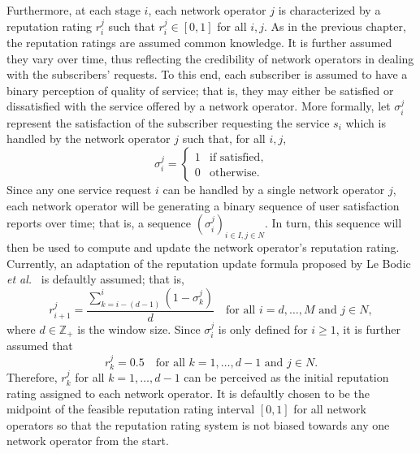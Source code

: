 Furthermore, at each stage $i$, each network operator $j$ is characterized by a reputation rating $r^j_i$ such that $r^j_i\in[0,1]$ for all $i,j$. As in the previous chapter, the reputation ratings are assumed common knowledge. It is further assumed they vary over time, thus reflecting the credibility of network operators in dealing with the subscribers' requests. To this end, each subscriber is assumed to have a binary perception of quality of service; that is, they may either be satisfied or dissatisfied with the service offered by a network operator. More formally, let $\sigma^j_i$ represent the satisfaction of the subscriber requesting the service $s_i$ which is handled by the network operator $j$ such that, for all $i,j$,
\begin{equation}
  \label{eq:def_users_satisfaction_dynamic}
  \sigma^j_i = \left\{
  \begin{array}{ll}
    1 &\text{if satisfied},\\
    0 &\text{otherwise}.
  \end{array}\right.
\end{equation}
Since any one service request $i$ can be handled by a single network operator $j$, each network operator will be generating a binary sequence of user satisfaction reports over time; that is, a sequence $(\sigma^j_i)_{i\in I,j\in N}$. In turn, this sequence will then be used to compute and update the network operator's reputation rating. Currently, an adaptation of the reputation update formula proposed by Le Bodic \emph{et al.}~\cite{DMLeBodic00} is defaultly assumed; that is,
\begin{equation}
  \label{eq:def_rep_update_lebodic_dynamic}
  r^j_{i+1} = \frac{\displaystyle\sum_{k=i-(d-1)}^{i}{(1-\sigma^j_k)}}{d} \quad\text{for all }i=d,\ldots,M \text{ and }j\in N,
\end{equation}
where $d\in \mathbb{Z}_+$ is the window size. Since $\sigma^j_i$ is only defined for $i\ge 1$, it is further assumed that
\begin{equation*}
  r^j_k = 0.5 \quad\text{for all }k=1,\ldots,d-1\text{ and }j\in N.
\end{equation*}
Therefore, $r^j_k$ for all $k=1,\ldots,d-1$ can be perceived as the initial reputation rating assigned to each network operator. It is defaultly chosen to be the midpoint of the feasible reputation rating interval $[0,1]$ for all network operators so that the reputation rating system is not biased towards any one network operator from the start.

